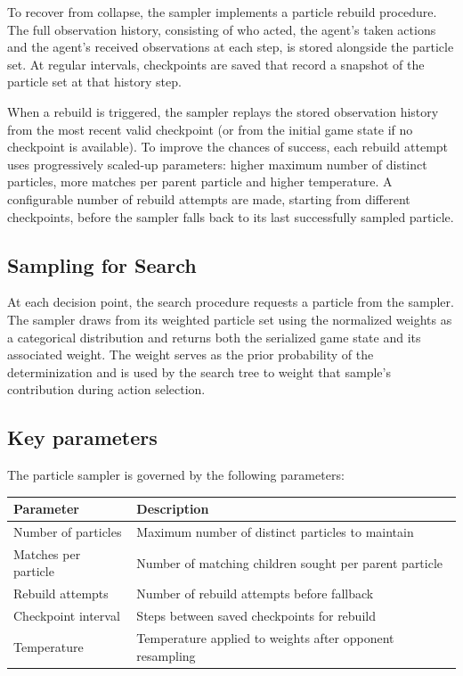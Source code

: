 \documentclass[12pt,oneside,openright]{article}
\begin{document}
To recover from collapse, the sampler implements a particle rebuild procedure. The full observation history, consisting of who acted, the agent's taken actions and the agent's received observations at each step, is stored alongside the particle set. At regular intervals, checkpoints are saved that record a snapshot of the particle set at that history step.

When a rebuild is triggered, the sampler replays the stored observation history from the most recent valid checkpoint (or from the initial game state if no checkpoint is available). To improve the chances of success, each rebuild attempt uses progressively scaled-up parameters: higher maximum number of distinct particles, more matches per parent particle and higher temperature. A configurable number of rebuild attempts are made, starting from different checkpoints, before the sampler falls back to its last successfully sampled particle.

\subsection{Sampling for Search}

At each decision point, the search procedure requests a particle from the sampler. The sampler draws from its weighted particle set using the normalized weights as a categorical distribution and returns both the serialized game state and its associated weight. The weight serves as the prior probability of the determinization and is used by the search tree to weight that sample's contribution during action selection.

\subsection{Key parameters}
The particle sampler is governed by the following parameters:
\begin{table}[H]
  \centering
  \begin{tabular}{@{} l l @{}}
    \toprule
    Parameter            & Description                                              \\
    \midrule
    Number of particles  & Maximum number of distinct particles to maintain         \\
    Matches per particle & Number of matching children sought per parent particle   \\
    Rebuild attempts     & Number of rebuild attempts before fallback               \\
    Checkpoint interval  & Steps between saved checkpoints for rebuild              \\
    Temperature          & Temperature applied to weights after opponent resampling \\
    \bottomrule
  \end{tabular}
\end{table}
\end{document}
